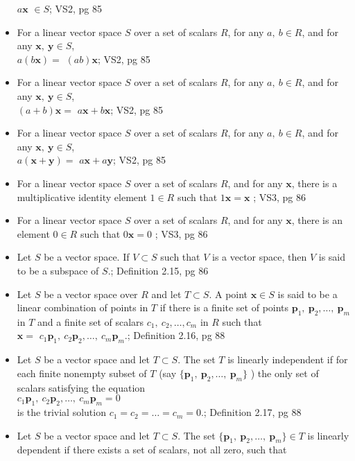 \documentclass{article}
\begin{document}
\begin{multicols}{2}
\begin{itemize}
$a\mathbf{x}$ $\in S$; VS2, pg 85
\item For a linear vector space $S$ over a set of scalars $R$, for any $a,\: b \in R$, and for any $\mathbf{x}, \: \mathbf{y} \in S $, \\
$a(b\mathbf{x}) = $ $ (ab)\mathbf{x} $; VS2, pg 85
\item For a linear vector space $S$ over a set of scalars $R$, for any $a,\: b \in R$, and for any $\mathbf{x}, \: \mathbf{y} \in S $, \\
$ (a + b)\mathbf{x} = $ $ a\mathbf{x} + b\mathbf{x}$; VS2, pg 85
\item For a linear vector space $S$ over a set of scalars $R$, for any $a,\: b \in R$, and for any $\mathbf{x}, \: \mathbf{y} \in S $, \\
$ a (\mathbf{x} + \mathbf{y}) = $ $ a \mathbf{x} + a\mathbf{y} $; VS2, pg 85
\item For a linear vector space $S$ over a set of scalars $R$, and for any $\mathbf{x}$, there is a multiplicative identity element $1 \in R$ such that $1\mathbf{x} = \mathbf{x}$ ; VS3, pg 86
\item For a linear vector space $S$ over a set of scalars $R$, and for any $\mathbf{x}$, there is an element $0 \in R$ such that $0\mathbf{x} = 0$ ; VS3, pg 86
\item Let $S$ be a vector space. If $V \subset S$ such that $V$ is a vector space, then $V$ is said to be a subspace of $S$.; Definition 2.15, pg 86
\item Let $S$ be a vector space over $R$ and let $T \subset S$. A point $\mathbf{x} \in S$ is said to be a linear combination of points in $T$ if there is a finite set of points $\mathbf{p}_1,\: \mathbf{p}_2,\dots,\:\mathbf{p}_m$ in $T$ and a finite set of scalars  $c_1,\:c_2,\dots,c_m$ in $R$ such that \\
$\mathbf{x} = $  $c_1 \mathbf{p}_1,\: c_2 \mathbf{p}_2, \dots, \: c_m \mathbf{p}_m$.; Definition 2.16, pg 88
\item Let $S$ be a vector space and let $T \subset S$. The set $T$ is linearly independent if for each finite nonempty subset of $T$ (say $ \{\mathbf{p}_1,\: \mathbf{p}_2,\dots,\:\mathbf{p}_m \} $ ) the only set of scalars satisfying the equation \\
$c_1 \mathbf{p}_1,\: c_2 \mathbf{p}_2, \dots, \: c_m \mathbf{p}_m = 0$  \\
is the trivial solution  $c_1 = c_2 = \dots = c_m = 0$.; Definition 2.17, pg 88
\item Let $S$ be a vector space and let $T \subset S$. The set $\{\mathbf{p}_1,\: \mathbf{p}_2,\dots,\:\mathbf{p}_m \} \in T$ is linearly dependent if there exists a set of scalars, not all zero, such that  \\

\end{itemize}
\end{multicols}
\end{document}
